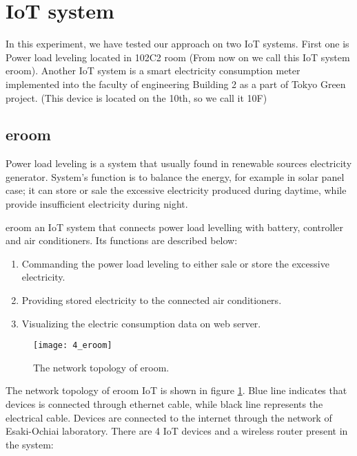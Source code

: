 \section{IoT system}
In this experiment, we have tested our approach on two IoT systems. First one is Power load leveling located in 102C2 room (From now on we call this IoT system eroom). Another IoT system is a smart electricity consumption meter implemented into the faculty of engineering Building 2 as a part of Tokyo Green project. (This device is located on the 10th, so we call it 10F)

\subsection{eroom}
Power load leveling is a system that usually found in renewable sources electricity generator. System’s function is to balance the energy, for example in solar panel case; it can store or sale the excessive electricity produced during daytime, while provide insufficient electricity during night. 

eroom an IoT system that connects power load levelling with battery, controller and air conditioners. Its functions are described below: 
\begin{enumerate}[itemsep=0mm]
    \item Commanding the power load leveling to either sale or store the excessive electricity.
    \item Providing stored electricity to the connected air conditioners. 
    \item Visualizing the electric consumption data on web server.
\end{enumerate}

\begin{figure}
    \centering 
    \texttt{[image: 4\_eroom]}
    \caption{\small The network topology of eroom.}
    \label{fig:s4_eroom}
\end{figure} 

The network topology of eroom IoT is shown in figure \ref{fig:s4_eroom}. 
Blue line indicates that devices is connected through ethernet cable, while black line represents the electrical cable. 
Devices are connected to the internet through the network of Esaki-Ochiai laboratory.
There are 4 IoT devices and a wireless router present in the system: 

